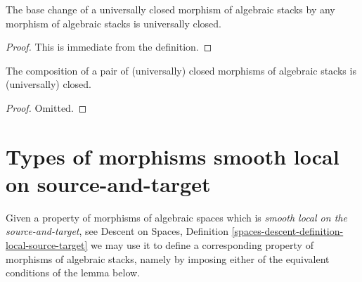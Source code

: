 \begin{lemma}
\label{lemma-base-change-universally-closed}
The base change of a universally closed morphism of algebraic stacks
by any morphism of algebraic stacks is universally closed.
\end{lemma}

\begin{proof}
This is immediate from the definition.
\end{proof}

\begin{lemma}
\label{lemma-composition-universally-closed}
The composition of a pair of (universally) closed morphisms of
algebraic stacks is (universally) closed.
\end{lemma}

\begin{proof}
Omitted.
\end{proof}












\section{Types of morphisms smooth local on source-and-target}
\label{section-local-source-target}

\noindent
Given a property of morphisms of algebraic spaces which is
{\it smooth local on the source-and-target}, see
Descent on Spaces,
Definition \ref{spaces-descent-definition-local-source-target}
we may use it to define a corresponding
property of morphisms of algebraic stacks, namely by imposing either of
the equivalent conditions of the lemma below.

